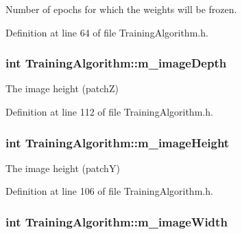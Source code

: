 Number of epochs for which the weights will be frozen. 



Definition at line 64 of file Training\+Algorithm.\+h.

\subsubsection[{\texorpdfstring{m\+\_\+image\+Depth}{m_imageDepth}}]{\setlength{\rightskip}{0pt plus 5cm}int Training\+Algorithm\+::m\+\_\+image\+Depth\hspace{0.3cm}{\ttfamily [private]}}\hypertarget{classTrainingAlgorithm_ab3aacb07912b0cd0cc4147b4c0851b1a}{}\label{classTrainingAlgorithm_ab3aacb07912b0cd0cc4147b4c0851b1a}


The image height (patchZ) 



Definition at line 112 of file Training\+Algorithm.\+h.

\subsubsection[{\texorpdfstring{m\+\_\+image\+Height}{m_imageHeight}}]{\setlength{\rightskip}{0pt plus 5cm}int Training\+Algorithm\+::m\+\_\+image\+Height\hspace{0.3cm}{\ttfamily [private]}}\hypertarget{classTrainingAlgorithm_a9e14a50086b4cd73974dab62cd74c722}{}\label{classTrainingAlgorithm_a9e14a50086b4cd73974dab62cd74c722}


The image height (patchY) 



Definition at line 106 of file Training\+Algorithm.\+h.

\subsubsection[{\texorpdfstring{m\+\_\+image\+Width}{m_imageWidth}}]{\setlength{\rightskip}{0pt plus 5cm}int Training\+Algorithm\+::m\+\_\+image\+Width\hspace{0.3cm}{\ttfamily [private]}}\hypertarget{classTrainingAlgorithm_a9f4488e51911884ae49107bb853099c6}{}\label{classTrainingAlgorithm_a9f4488e51911884ae49107bb853099c6}


